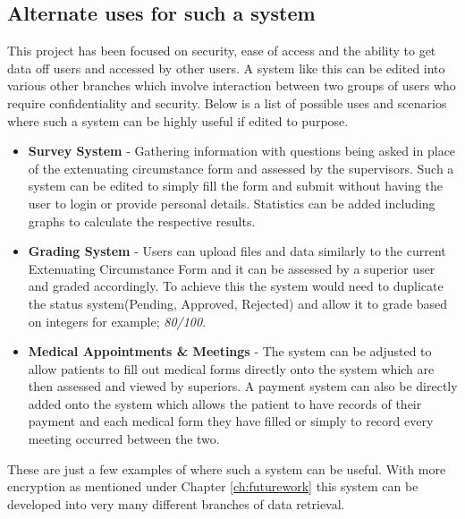 \documentclass[../main.tex]{subfiles}
\begin{document}
\subsection*{Alternate uses for such a system}
This project has been focused on security, ease of access and the ability to get data off users and accessed by other users. A system like this can be edited into various other branches which involve interaction between two groups of users who require confidentiality and security. Below is a list of possible uses and scenarios where such a system can be highly useful if edited to purpose. 
\begin{itemize}
\item \textbf{Survey System} - Gathering information with questions being asked in place of the extenuating circumstance form and assessed by the supervisors. Such a system can be edited to simply fill the form and submit without having the user to login or provide personal details. Statistics can be added including graphs to calculate the respective results. 
\item \textbf{Grading System} - Users can upload files and data similarly to the current Extenuating Circumstance Form and it can be assessed by a superior user and graded accordingly. To achieve this the system would need to duplicate the status system(Pending, Approved, Rejected) and allow it to grade based on integers for example; \textit{80/100}.
\item \textbf{Medical Appointments \& Meetings} - The system can be adjusted to allow patients to fill out medical forms directly onto the system which are then assessed and viewed by superiors. A payment system can also be directly added onto the system which allows the patient to have records of their payment and each medical form they have filled or simply to record every meeting occurred between the two. 
\end{itemize}
These are just a few examples of where such a system can be useful. With more encryption as mentioned under Chapter \ref{ch:futurework} this system can be developed into very many different branches of data retrieval.
\end{document}
